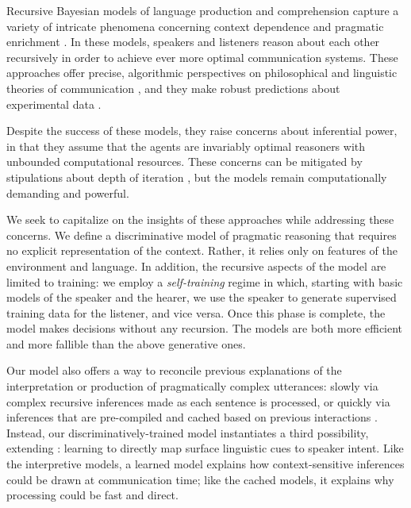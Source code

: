Recursive Bayesian models of language production and comprehension
capture a variety of intricate phenomena concerning context dependence 
and pragmatic enrichment 
\citep{Jaeger:2007,
Franke09DISS,
Frank:Goodman:2012,
Bergen:Goodman:Levy:2012,
Vogel-etal:2013,
Smith:Goodman:Frank:2013}.
In these models, speakers and listeners reason about each other
recursively in order to achieve ever more optimal communication
systems. These approaches offer precise, algorithmic perspectives on
philosophical and linguistic theories of communication
\citep{Lewis69,Grice75,Horn84}, and they make robust predictions about
experimental data
\citep{Stiller:Goodman:Frank:2011,Rohde-etal:2012,Degen-etal:2013}.

Despite the success of these models, they raise concerns about
inferential power, in that they assume that the agents are
invariably optimal reasoners with unbounded computational resources.
These concerns can be mitigated by stipulations about depth of
iteration \citep{CamererHo:2004,Franke09DISS,Jaeger:2007,Jaeger:2011}, but the
models remain computationally demanding and powerful.

We seek to capitalize on the insights of these approaches while
addressing these concerns. We define a discriminative model of
pragmatic reasoning that requires no explicit representation of the
context. Rather, it relies only on features of the environment and
language. In addition, the recursive aspects of the model are limited
to training: we employ a \emph{self-training} regime in which,
starting with basic models of the speaker and the hearer, we use the
speaker to generate supervised training data for the listener, and
vice versa. Once this phase is complete, the model makes decisions
without any recursion. The models are both more efficient and more
fallible than the above generative ones. 

Our model also offers a way to reconcile previous explanations of the
interpretation or production of pragmatically complex utterances:
slowly via complex recursive inferences made as each sentence is
processed, \citep{Geurts09,Huang:Snedeker:2009} or quickly via
inferences that are pre-compiled and cached based on previous
interactions
\citep{Levinson00,Grodner-etal:2010,Smith:Goodman:Frank:2013}. Instead,
our discriminatively-trained model instantiates a third possibility,
extending \citealt{Jurafsky04}: learning to directly map surface
linguistic cues to speaker intent. Like the interpretive models, a
learned model explains how context-sensitive inferences could be drawn
at communication time; like the cached models, it explains why
processing could be fast and direct.

